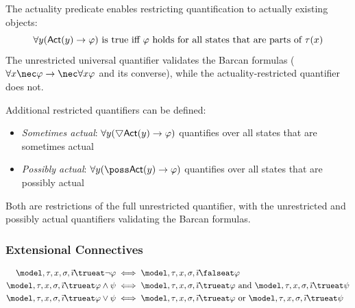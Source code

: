\documentclass[../LogosReference.tex]{subfiles}
\begin{document}
\begin{remark}
The actuality predicate enables restricting quantification to actually existing objects:
\[
    \forall y(\mathsf{Act}(y) \to \varphi) \text{ is true iff } \varphi \text{ holds for all states that are parts of } \tau(x)
\]
The unrestricted universal quantifier validates the Barcan formulas ($\forall x \nec\metaA \to \nec\forall x\metaA$ and its converse), while the actuality-restricted quantifier does not.

Additional restricted quantifiers can be defined:
\begin{itemize}
    \item \emph{Sometimes actual}: $\forall y(\sometimes\actual(y) \to \metaA)$ quantifies over all states that are sometimes actual
    \item \emph{Possibly actual}: $\forall y(\poss\actual(y) \to \metaA)$ quantifies over all states that are possibly actual
\end{itemize}
Both are restrictions of the full unrestricted quantifier, with the unrestricted and possibly actual quantifiers validating the Barcan formulas.
\end{remark}


\subsubsection{Extensional Connectives}

\begin{definition}\label{def:extensional-truth}
	\begin{align}
		\model, \tau, x, \assignment, \tempindex \trueat \neg\metaA          & \iff \model, \tau, x, \assignment, \tempindex \falseat \metaA                                                                         \\
		\model, \tau, x, \assignment, \tempindex \trueat \metaA \land \metaB & \iff \model, \tau, x, \assignment, \tempindex \trueat \metaA \text{ and } \model, \tau, x, \assignment, \tempindex \trueat \metaB \\
		\model, \tau, x, \assignment, \tempindex \trueat \metaA \lor \metaB  & \iff \model, \tau, x, \assignment, \tempindex \trueat \metaA \text{ or } \model, \tau, x, \assignment, \tempindex \trueat \metaB
	\end{align}
\end{definition}
\end{document}
